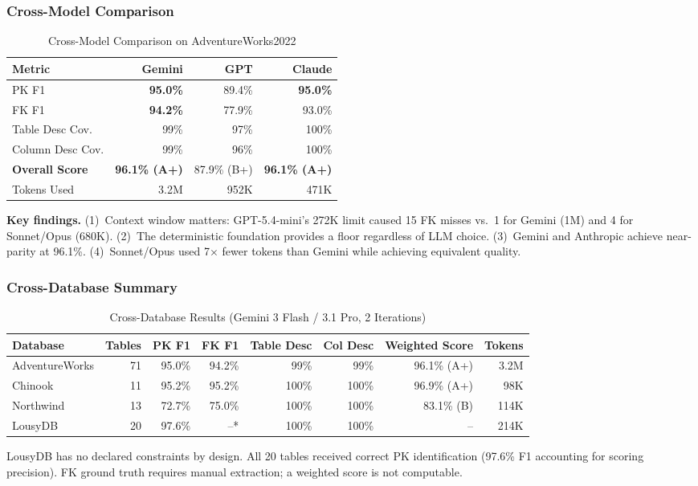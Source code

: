 \documentclass[sigconf, nonacm]{acmart}
\begin{document}
\subsubsection{Cross-Model Comparison}

\begin{table}[htbp]
\caption{Cross-Model Comparison on AdventureWorks2022}
\label{tab:crossmodel}
\begin{tabular}{lrrr}
\toprule
\textbf{Metric} & \textbf{Gemini} & \textbf{GPT} & \textbf{Claude} \\
\midrule
PK F1 & \textbf{95.0\%} & 89.4\% & \textbf{95.0\%} \\
FK F1 & \textbf{94.2\%} & 77.9\% & 93.0\% \\
Table Desc Cov. & 99\% & 97\% & 100\% \\
Column Desc Cov. & 99\% & 96\% & 100\% \\
\textbf{Overall Score} & \textbf{96.1\% (A+)} & 87.9\% (B+) & \textbf{96.1\% (A+)} \\
Tokens Used & 3.2M & 952K & 471K \\
\bottomrule
\end{tabular}
\end{table}

\textbf{Key findings.} (1)~Context window matters: GPT-5.4-mini's 272K limit caused 15 FK misses vs.\ 1 for Gemini (1M) and 4 for Sonnet/Opus (680K). (2)~The deterministic foundation provides a floor regardless of LLM choice. (3)~Gemini and Anthropic achieve near-parity at 96.1\%. (4)~Sonnet/Opus used 7$\times$ fewer tokens than Gemini while achieving equivalent quality.

\subsubsection{Cross-Database Summary}

\begin{table}[htbp]
\caption{Cross-Database Results (Gemini 3 Flash / 3.1 Pro, 2 Iterations)}
\label{tab:crossdb}
\centering
\begin{tabular}{lrrrrrrr}
\toprule
\textbf{Database} & \textbf{Tables} & \textbf{PK F1} & \textbf{FK F1} & \textbf{Table Desc} & \textbf{Col Desc} & \textbf{Weighted Score} & \textbf{Tokens} \\
\midrule
AdventureWorks & 71 & 95.0\% & 94.2\% & 99\% & 99\% & 96.1\% (A+) & 3.2M \\
Chinook & 11 & 95.2\% & 95.2\% & 100\% & 100\% & 96.9\% (A+) & 98K \\
Northwind & 13 & 72.7\% & 75.0\% & 100\% & 100\% & 83.1\% (B) & 114K \\
LousyDB & 20 & 97.6\% & --* & 100\% & 100\% & -- & 214K \\
\bottomrule
\end{tabular}
\begin{flushleft}
\small *LousyDB has no declared constraints by design. All 20 tables received correct PK identification (97.6\% F1 accounting for scoring precision). FK ground truth requires manual extraction; a weighted score is not computable.
\end{flushleft}
\end{table}
\end{document}
